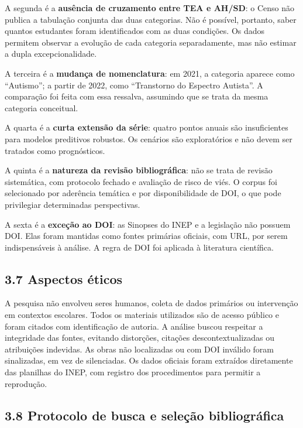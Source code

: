 A segunda é a \textbf{ausência de cruzamento entre TEA e AH/SD}: o Censo
não publica a tabulação conjunta das duas categorias. Não é possível,
portanto, saber quantos estudantes foram identificados com as duas
condições. Os dados permitem observar a evolução de cada categoria
separadamente, mas não estimar a dupla excepcionalidade.

A terceira é a \textbf{mudança de nomenclatura}: em 2021, a categoria
aparece como ``Autismo''; a partir de 2022, como ``Transtorno do
Espectro Autista''. A comparação foi feita com essa ressalva, assumindo
que se trata da mesma categoria conceitual.

A quarta é a \textbf{curta extensão da série}: quatro pontos anuais são
insuficientes para modelos preditivos robustos. Os cenários são
exploratórios e não devem ser tratados como prognósticos.

A quinta é a \textbf{natureza da revisão bibliográfica}: não se trata de
revisão sistemática, com protocolo fechado e avaliação de risco de viés.
O corpus foi selecionado por aderência temática e por disponibilidade de
DOI, o que pode privilegiar determinadas perspectivas.

A sexta é a \textbf{exceção ao DOI}: as Sinopses do INEP e a legislação
não possuem DOI. Elas foram mantidas como fontes primárias oficiais, com
URL, por serem indispensáveis à análise. A regra de DOI foi aplicada à
literatura científica.

\subsection{3.7 Aspectos éticos}\label{aspectos-uxe9ticos}

A pesquisa não envolveu seres humanos, coleta de dados primários ou
intervenção em contextos escolares. Todos os materiais utilizados são de
acesso público e foram citados com identificação de autoria. A análise
buscou respeitar a integridade das fontes, evitando distorções, citações
descontextualizadas ou atribuições indevidas. As obras não localizadas
ou com DOI inválido foram sinalizadas, em vez de silenciadas. Os dados
oficiais foram extraídos diretamente das planilhas do INEP, com registro
dos procedimentos para permitir a reprodução.

\subsection{3.8 Protocolo de busca e seleção
bibliográfica}\label{protocolo-de-busca-e-seleuxe7uxe3o-bibliogruxe1fica}


